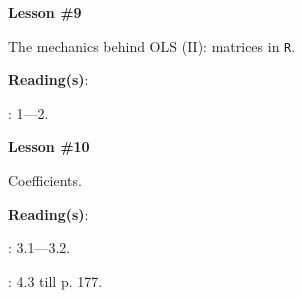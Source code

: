 \documentclass[letterpaper]{article}
\renewenvironment{itemize}{
  \begin{list}{}{
    \setlength{\leftmargin}{1.5em}
  }
}{
  \end{list}
}
\begin{document}
\begin{enumerate}

			\begin{itemize} 
				\item[$\bullet$] {\bf Lesson \#9}
					\begin{itemize} 
						\item[$\circ$] The mechanics behind OLS (II): matrices in \texttt{R}.
            \item[$\circ$] {\bf Reading(s)}: 
            \begin{itemize}
              \item[$\diamond$] \textcite{Namboodiri1984}: 1---2.
            \end{itemize}
					\end{itemize}
			\end{itemize}



			\begin{itemize} 
				\item[$\bullet$] {\bf Lesson \#10}
					\begin{itemize} 
						\item[$\circ$] Coefficients. %
						\item[$\circ$] {\bf Reading(s)}: 
							\begin{itemize}
								\item[$\diamond$] \textcite{Wooldridge2002}: 3.1---3.2.
                \item[$\diamond$] \textcite{Fox:2010vc}: 4.3 till p. 177.
							\end{itemize}
					\end{itemize}
			\end{itemize}




\end{enumerate}
\end{document}

